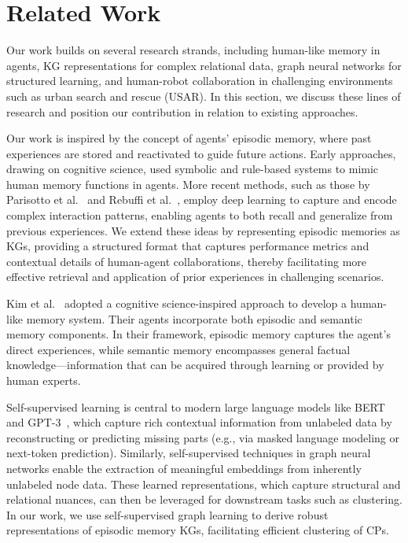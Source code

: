 \documentclass[letterpaper]{article} %
\begin{document}
\section{Related Work}
\label{sec:related_work}

Our work builds on several research strands, including human-like memory in agents, KG representations for complex relational data, graph neural networks for structured learning, and human-robot collaboration in challenging environments such as urban search and rescue (USAR). In this section, we discuss these lines of research and position our contribution in relation to existing approaches.

Our work is inspired by the concept of agents' episodic memory, where past experiences are stored and reactivated to guide future actions. Early approaches, drawing on cognitive science, used symbolic and rule-based systems to mimic human memory functions in agents. More recent methods, such as those by Parisotto et al.~\cite{pmlr-v70-pritzel17a} and Rebuffi et al.~\cite{chaudhry2019efficientlifelonglearningagem}, employ deep learning to capture and encode complex interaction patterns, enabling agents to both recall and generalize from previous experiences. We extend these ideas by representing episodic memories as KGs, providing a structured format that captures performance metrics and contextual details of human-agent collaborations, thereby facilitating more effective retrieval and application of prior experiences in challenging scenarios.

Kim et al.~\cite{https://doi.org/10.48550/arxiv.2204.01611,Kim_Cochez_Francois-Lavet_Neerincx_Vossen_2023} adopted a cognitive science-inspired approach to develop a human-like memory system. Their agents incorporate both episodic and semantic memory components. In their framework, episodic memory captures the agent's direct experiences, while semantic memory encompasses general factual knowledge—information that can be acquired through learning or provided by human experts.

Self-supervised learning is central to modern large language models like BERT~\cite{DBLP:journals/corr/abs-1810-04805} and GPT-3~\cite{DBLP:journals/corr/abs-2005-14165}, which capture rich contextual information from unlabeled data by reconstructing or predicting missing parts (e.g., via masked language modeling or next-token prediction). Similarly, self-supervised techniques in graph neural networks enable the extraction of meaningful embeddings from inherently unlabeled node data. These learned representations, which capture structural and relational nuances, can then be leveraged for downstream tasks such as clustering. In our work, we use self-supervised graph learning to derive robust representations of episodic memory KGs, facilitating efficient clustering of CPs.
\end{document}
